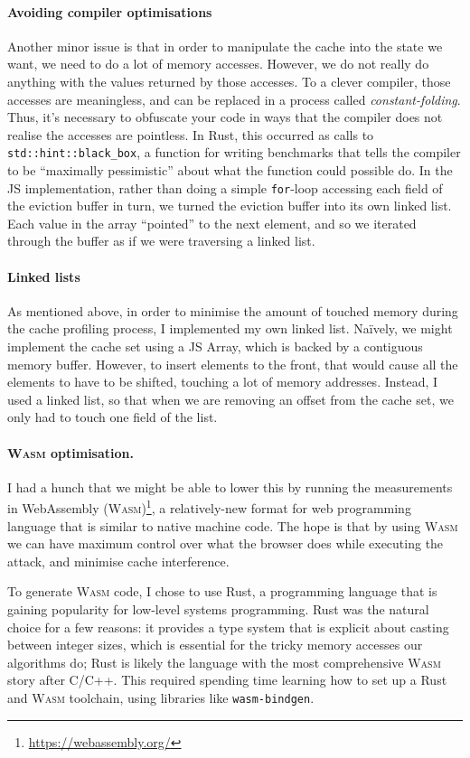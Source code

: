 \documentclass[a4paper,10pt,twocolumn]{article}
\theoremstyle{definition}
\newcommand*{\code}{\texttt}
\newcommand*{\acronym}{\textsc}
\newcommand*{\WASM}{\acronym{Wasm}}
\begin{document}
\paragraph{Avoiding compiler optimisations}
Another minor issue is that in order to manipulate the cache into the state we
want, we need to do a lot of memory accesses.
However, we do not really do anything with the values returned by those
accesses.
To a clever compiler, those accesses are meaningless, and can be replaced in a
process called \emph{constant-folding}.
Thus, it's necessary to obfuscate your code in ways that the compiler does not
realise the accesses are pointless.
In Rust, this occurred as calls to \code{std::hint::black\_box}, a function for
writing benchmarks that tells the compiler to be ``maximally pessimistic'' about
what the function could possible do.
In the JS implementation, rather than doing a simple \code{for}-loop accessing
each field of the eviction buffer in turn, we turned the eviction buffer into
its own linked list.
Each value in the array ``pointed'' to the next element, and so we iterated
through the buffer as if we were traversing a linked list.

\paragraph{Linked lists}
As mentioned above, in order to minimise the amount of touched memory during the
cache profiling process, I implemented my own linked list.
Na\"ively, we might implement the cache set using a JS Array, which is backed by
a contiguous memory buffer.
However, to insert elements to the front, that would cause all the elements to
have to be shifted, touching a lot of memory addresses.
Instead, I used a linked list, so that when we are removing an offset from the
cache set, we only had to touch one field of the list.

\paragraph{\WASM{} optimisation.}
I had a hunch that we might be able to lower this by running the measurements in
WebAssembly (\WASM{})\footnote{\url{https://webassembly.org/}}, a relatively-new
format for web programming language that is similar to native machine code.
The hope is that by using \WASM{} we can have maximum control over what the browser
does while executing the attack, and minimise cache interference.

To generate \WASM{} code, I chose to use Rust, a programming language that is
gaining popularity for low-level systems programming.
Rust was the natural choice for a few reasons:
it provides a type system that is explicit about casting between
integer sizes, which is essential for the tricky memory accesses our algorithms
do;
Rust is likely the language with the most comprehensive \WASM{} story after C/C++.
This required spending time learning how to set up a Rust and \WASM{} toolchain,
using libraries like \code{wasm-bindgen}.
\end{document}
